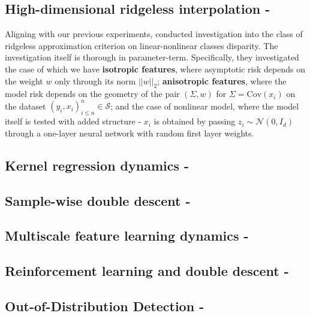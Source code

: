 \documentclass[10pt]{article} %
\begin{document}
\clearpage
\subsection{High-dimensional ridgeless interpolation - \cite{hastie2019surprises}}
Aligning with our previous experiments, \cite{hastie2019surprises} conducted investigation into the class of ridgeless approximation criterion on linear-nonlinear classes disparity. The investigation itself is thorough in parameter-term. Specifically, they investigated the case of which we have \textbf{isotropic features}, where asymptotic risk depends on the weight $w$ only through its norm $||w||_{2}$; \textbf{anisotropic features}, where the model risk depends on the geometry of the pair $(\Sigma, w)$ for $\Sigma = \mathrm{Cov}(x_{i})$ on the dataset $(y_{i},x_{i})^{n}_{i\leq n}\in\mathcal{S}$; and the case of nonlinear model, where the model itself is tested with added structure - $x_{i}$ is obtained by passing $z_{i}\sim\mathcal{N}(0,I_d)$ through a one-layer neural network with random first layer weights.  
\clearpage

\subsection{Kernel regression dynamics - \cite{liu2021kernelregressionhighdimensions}}

\clearpage

\subsection{Sample-wise double descent - \cite{nakkiran2019moredata}}

\clearpage

\subsection{Multiscale feature learning dynamics - \cite{pezeshki2021multiscalefeaturelearningdynamics}}

\clearpage

\subsection{Reinforcement learning and double descent - \cite{brellmann2024on}}

\clearpage

\subsection{Out-of-Distribution Detection - \cite{ammar2025doubledescentmeetsoutofdistribution}}
\end{document}

